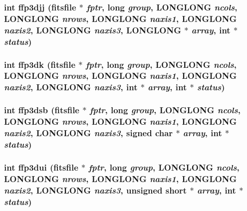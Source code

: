 \subsubsection{\setlength{\rightskip}{0pt plus 5cm}int ffp3djj (\bf{fitsfile} $\ast$ {\em fptr}, long {\em group}, \bf{LONGLONG} {\em ncols}, \bf{LONGLONG} {\em nrows}, \bf{LONGLONG} {\em naxis1}, \bf{LONGLONG} {\em naxis2}, \bf{LONGLONG} {\em naxis3}, \bf{LONGLONG} $\ast$ {\em array}, int $\ast$ {\em status})}\label{fitsio_8h_4b7964ba335cd471910d79a4055aeb1d}


\subsubsection{\setlength{\rightskip}{0pt plus 5cm}int ffp3dk (\bf{fitsfile} $\ast$ {\em fptr}, long {\em group}, \bf{LONGLONG} {\em ncols}, \bf{LONGLONG} {\em nrows}, \bf{LONGLONG} {\em naxis1}, \bf{LONGLONG} {\em naxis2}, \bf{LONGLONG} {\em naxis3}, int $\ast$ {\em array}, int $\ast$ {\em status})}\label{fitsio_8h_e695cca6e553d21f86ee71051783c338}


\subsubsection{\setlength{\rightskip}{0pt plus 5cm}int ffp3dsb (\bf{fitsfile} $\ast$ {\em fptr}, long {\em group}, \bf{LONGLONG} {\em ncols}, \bf{LONGLONG} {\em nrows}, \bf{LONGLONG} {\em naxis1}, \bf{LONGLONG} {\em naxis2}, \bf{LONGLONG} {\em naxis3}, signed char $\ast$ {\em array}, int $\ast$ {\em status})}\label{fitsio_8h_0f9d96f6b290622b85f3dca6c11ea791}


\subsubsection{\setlength{\rightskip}{0pt plus 5cm}int ffp3dui (\bf{fitsfile} $\ast$ {\em fptr}, long {\em group}, \bf{LONGLONG} {\em ncols}, \bf{LONGLONG} {\em nrows}, \bf{LONGLONG} {\em naxis1}, \bf{LONGLONG} {\em naxis2}, \bf{LONGLONG} {\em naxis3}, unsigned short $\ast$ {\em array}, int $\ast$ {\em status})}\label{fitsio_8h_1dd3e0662151506b0470d7348493663d}


